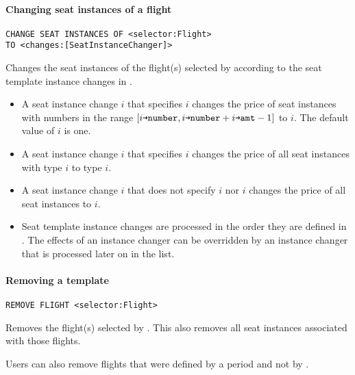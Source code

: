 \paragraph{Changing seat instances of a flight}
\begin{operation}
  \begin{lstlisting}
CHANGE SEAT INSTANCES OF <selector:Flight>
TO <changes:[SeatInstanceChanger]>
  \end{lstlisting}
\end{operation}
Changes the seat instances of the flight(s) selected by
 according to the seat template instance changes in .
\begin{itemize}
  \item A seat instance change $i$ that specifies $i$ changes the
    price of seat instances with numbers in the range
    $[i\texttt{→number},i\texttt{→number}+i\texttt{→amt}-1]$ to $i$.  The
    default value of $i$ is one.

  \item A seat instance change $i$ that specifies $i$ changes the
    price of all seat instances with type $i$ to type $i$.

  \item A seat instance change $i$ that does not specify $i$
    nor $i$ changes the price of all seat instances to
    $i$.

  \item Seat template instance changes are processed in the order they are
    defined in . The effects of an instance changer can be overridden
    by an instance changer that is processed later on in the list.
\end{itemize}

\paragraph{Removing a template}
\begin{operation}
  \begin{lstlisting}
REMOVE FLIGHT <selector:Flight>
  \end{lstlisting}
\end{operation}
Removes the flight(s) selected by . This also removes all seat
instances associated with those flights.

Users can also remove flights that were defined by a period and not by
.


